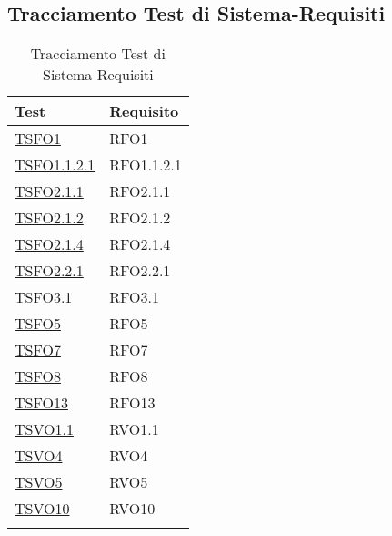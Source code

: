 \subsection{Tracciamento Test di Sistema-Requisiti}
\normalsize
\begin{longtable}{|>{\centering}m{5cm}|m{5cm}<{\centering}|}
\hline 
\textbf{Test} & \textbf{Requisito}\\
\hline
\endhead
\hyperlink{TSFO1}{TSFO1} & RFO1\\ \hline
\hyperlink{TSFO1.1.2.1}{TSFO1.1.2.1} & RFO1.1.2.1\\ \hline
\hyperlink{TSFO2.1.1}{TSFO2.1.1} & RFO2.1.1\\ \hline
\hyperlink{TSFO2.1.2}{TSFO2.1.2} & RFO2.1.2\\ \hline
\hyperlink{TSFO2.1.4}{TSFO2.1.4} & RFO2.1.4\\ \hline
\hyperlink{TSFO2.2.1}{TSFO2.2.1} & RFO2.2.1\\ \hline
\hyperlink{TSFO3.1}{TSFO3.1} & RFO3.1\\ \hline
\hyperlink{TSFO5}{TSFO5} & RFO5\\ \hline
\hyperlink{TSFO7}{TSFO7} & RFO7\\ \hline
\hyperlink{TSFO8}{TSFO8} & RFO8\\ \hline
\hyperlink{TSFO13}{TSFO13} & RFO13\\ \hline
\hyperlink{TSVO1.1}{TSVO1.1} & RVO1.1\\ \hline
\hyperlink{TSVO4}{TSVO4} & RVO4\\ \hline
\hyperlink{TSVO5}{TSVO5} & RVO5\\ \hline
\hyperlink{TSVO10}{TSVO10} & RVO10\\ \hline
\caption[Tracciamento Test di Sistema-Requisiti]{Tracciamento Test di Sistema-Requisiti}
\label{tabella:ts-requi}
\end{longtable}
\clearpage
